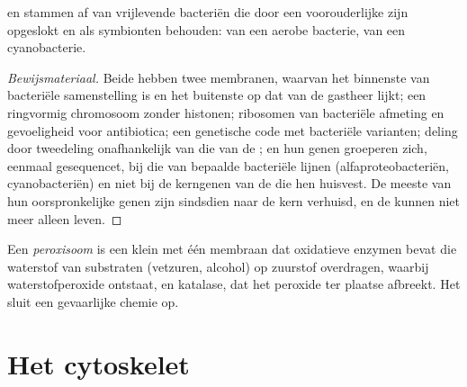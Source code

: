 \begin{proposition}\label{prop:b1:eukaryotic-cell:endosymbiosis}
 en  stammen af van vrijlevende bacteriën die door een
voorouderlijke  zijn opgeslokt en als symbionten behouden:
 van een aerobe bacterie,  van een cyanobacterie.
\end{proposition}
\begin{proof}[Bewijsmateriaal]
Beide  hebben twee membranen, waarvan het binnenste van bacteriële
samenstelling is en het buitenste op dat van de gastheer lijkt; een ringvormig
chromosoom zonder histonen; ribosomen van bacteriële afmeting en gevoeligheid voor
antibiotica; een genetische code met bacteriële varianten; deling door tweedeling
onafhankelijk van die van de ; en hun genen groeperen zich, eenmaal gesequencet,
bij die van bepaalde bacteriële lijnen (alfaproteobacteriën, cyanobacteriën) en
niet bij de kerngenen van de  die hen huisvest. De meeste van hun
oorspronkelijke genen zijn sindsdien naar de kern verhuisd, en de 
kunnen niet meer alleen leven.
\end{proof}

\begin{definition}[Peroxisoom]\label{def:b1:eukaryotic-cell:peroxisome}
Een \emph{peroxisoom} is een klein  met één membraan dat
oxidatieve enzymen bevat die waterstof van substraten (vetzuren, alcohol) op
zuurstof overdragen, waarbij waterstofperoxide ontstaat, en katalase, dat het
peroxide ter plaatse afbreekt. Het sluit een gevaarlijke chemie op.
\end{definition}

\section{Het cytoskelet}

